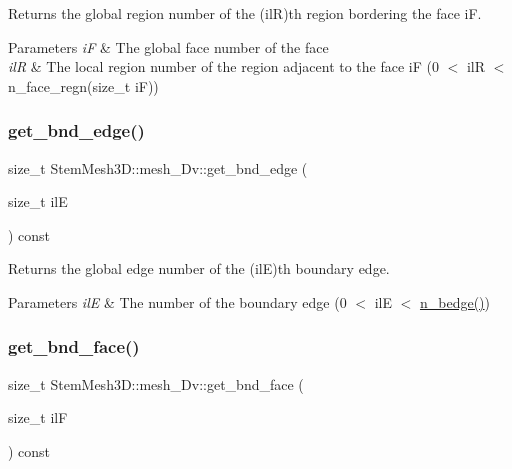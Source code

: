 Returns the global region number of the (ilR)\textquotesingle{}th region bordering the face iF. 


\begin{DoxyParams}{Parameters}
{\em iF} & The global face number of the face \\
\hline
{\em ilR} & The local region number of the region adjacent to the face iF (0 $<$ ilR $<$ n\+\_\+face\+\_\+regn(size\+\_\+t i\+F)) \\
\hline
\end{DoxyParams}
\mbox{\label{classStemMesh3D_1_1mesh__3Dv_a329a4b4f0ae621e3a700c61d52f82fdd}} 
\subsubsection{\texorpdfstring{get\+\_\+bnd\+\_\+edge()}{get\_bnd\_edge()}}
{\footnotesize\ttfamily size\+\_\+t Stem\+Mesh3\+D\+::mesh\+\_\+Dv\+::get\+\_\+bnd\+\_\+edge (\begin{DoxyParamCaption}\item[{size\+\_\+t}]{ilE }\end{DoxyParamCaption}) const}



Returns the global edge number of the (ilE)\textquotesingle{}th boundary edge. 


\begin{DoxyParams}{Parameters}
{\em ilE} & The number of the boundary edge (0 $<$ ilE $<$ \hyperlink{classStemMesh3D_1_1mesh__3Dv_aa9793810147053ffdfcd9cc9eeaec160}{n\+\_\+bedge()}) \\
\hline
\end{DoxyParams}
\mbox{\label{classStemMesh3D_1_1mesh__3Dv_a990498932160b3031badb906be06fb84}} 
\subsubsection{\texorpdfstring{get\+\_\+bnd\+\_\+face()}{get\_bnd\_face()}}
{\footnotesize\ttfamily size\+\_\+t Stem\+Mesh3\+D\+::mesh\+\_\+Dv\+::get\+\_\+bnd\+\_\+face (\begin{DoxyParamCaption}\item[{size\+\_\+t}]{ilF }\end{DoxyParamCaption}) const}




